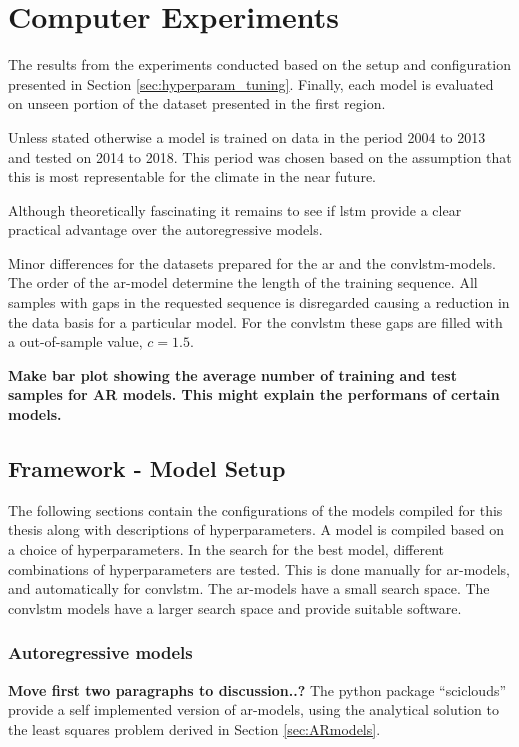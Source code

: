 \chapter{Computer Experiments}

The results from the experiments conducted based on the setup and configuration presented in Section \ref{sec:hyperparam_tuning}. Finally, each model is evaluated on unseen portion of the dataset presented in the first region.

Unless stated otherwise a model is trained on data in the period 2004 to 2013 and tested on 2014 to 2018. This period was chosen based on the assumption that this is most representable for the climate in the near future.

Although theoretically fascinating it remains to see if \acrshort{lstm} provide a clear practical advantage over the autoregressive models.

Minor differences for the datasets prepared for the \acrshort{ar} and the \acrshort{convlstm}-models. The order of the \acrshort{ar}-model determine the length of the training sequence. All samples with gaps in the requested sequence is disregarded causing a reduction in the data basis for a particular model. For the \acrshort{convlstm} these gaps are filled with a out-of-sample value, $c=1.5$.

\textbf{Make bar plot showing the average number of training and test samples for AR models. This might explain the performans of certain models. }



\section{Framework - Model Setup}
The following sections contain the configurations of the models compiled for this thesis along with descriptions of hyperparameters. A model is compiled based on a choice of hyperparameters. In the search for the best model, different combinations of hyperparameters are tested. This is done manually for \acrshort{ar}-models, and automatically for \acrshort{convlstm}. The \acrshort{ar}-models have a small search space. The \acrshort{convlstm} models have a larger search space and  provide suitable software. 


\subsection{Autoregressive models}
\textbf{Move first two paragraphs to discussion..?}
The python package ``sciclouds'' provide a self implemented version of \acrshort{ar}-models, using the analytical solution to the least squares problem derived in Section \ref{sec:ARmodels}. 

